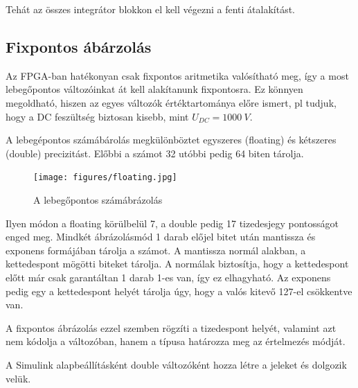 Tehát az összes integrátor blokkon el kell végezni a fenti átalakítást.


\subsection{Fixpontos ábárzolás}

Az FPGA-ban hatékonyan csak fixpontos aritmetika valósítható meg, így a most lebegőpontos változóinkat át kell alakítanunk fixpontosra. Ez könnyen megoldható, hiszen az egyes változók értéktartománya előre ismert, pl tudjuk, hogy a DC feszültség biztosan kisebb, mint $U_{DC}=1000\ V$.

A lebegépontos számábárolás megkülönböztet egyszeres (floating) és kétszeres (double) precizitást. Előbbi a számot 32 utóbbi pedig 64 biten tárolja.

\begin{figure}[H!]
	\centering
	\texttt{[image: figures/floating.jpg]}
	\caption{A lebegőpontos számábrázolás} 
	\label{fig:floating}
\end{figure}

Ilyen módon a floating körülbelül 7, a double pedig 17 tizedesjegy pontosságot enged meg. Mindkét ábrázolásmód 1 darab előjel bitet után mantissza és exponens formájában tárolja a számot. A mantissza normál alakban, a kettedespont mögötti biteket tárolja. A normálak biztosítja, hogy a kettedespont előtt már csak garantáltan 1 darab 1-es van, így ez elhagyható. Az exponens pedig egy a kettedespont helyét tárolja úgy, hogy a valós kitevő 127-el csökkentve van.

A fixpontos ábrázolás ezzel szemben rögzíti a tizedespont helyét, valamint azt nem kódolja a változóban, hanem a típusa határozza meg az értelmezés módját.


A Simulink alapbeállításként double változóként hozza létre a jeleket és dolgozik velük. 